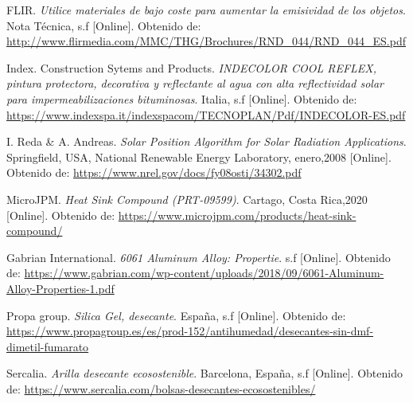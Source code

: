 \documentclass[notitlepage,oneside]{book}
\begin{document}
\begin{thebibliography}{99}
FLIR. \emph {Utilice materiales de bajo coste para aumentar la emisividad de los objetos}. Nota Técnica, s.f [Online]. Obtenido de: \url{http://www.flirmedia.com/MMC/THG/Brochures/RND_044/RND_044_ES.pdf}

Index. Construction Sytems and Products. \emph {INDECOLOR COOL REFLEX, pintura protectora, decorativa y reflectante al agua con alta reflectividad solar para impermeabilizaciones bituminosas}. Italia, s.f [Online]. Obtenido de: \url{https://www.indexspa.it/indexspacom/TECNOPLAN/Pdf/INDECOLOR-ES.pdf}

I. Reda \& A. Andreas. \emph {Solar Position Algorithm for Solar Radiation Applications}. Springfield, USA, National Renewable Energy Laboratory, enero,2008 [Online]. Obtenido de: \url{https://www.nrel.gov/docs/fy08osti/34302.pdf}

MicroJPM. \emph {Heat Sink Compound (PRT-09599)}. Cartago, Costa Rica,2020 [Online]. Obtenido de: \url{https://www.microjpm.com/products/heat-sink-compound/}

Gabrian International. \emph {6061 Aluminum Alloy: Propertie}. s.f [Online]. Obtenido de: \url{https://www.gabrian.com/wp-content/uploads/2018/09/6061-Aluminum-Alloy-Properties-1.pdf}

Propa group. \emph {Silica Gel, desecante}. España, s.f [Online]. Obtenido de: \url{https://www.propagroup.es/es/prod-152/antihumedad/desecantes-sin-dmf-dimetil-fumarato}

Sercalia. \emph {Arilla desecante ecosostenible}. Barcelona, España,  s.f [Online]. Obtenido de: \url{https://www.sercalia.com/bolsas-desecantes-ecosostenibles/}

\end{thebibliography}
\end{document}
